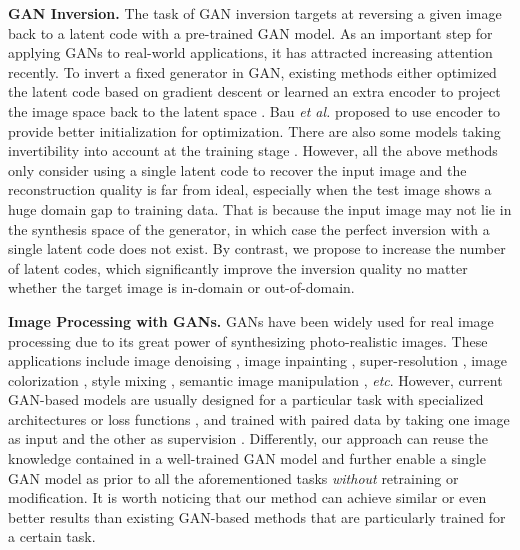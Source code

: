 \documentclass[10pt,twocolumn,letterpaper]{article}
\begin{document}
\vspace{2pt}\noindent\textbf{GAN Inversion.}
The task of GAN inversion targets at reversing a given image back to a latent code with a pre-trained GAN model.
As an important step for applying GANs to real-world applications, it has attracted increasing attention recently.
To invert a fixed generator in GAN, existing methods either optimized the latent code based on gradient descent \cite{lipton2017precise,inverting2018,invertibility} or learned an extra encoder to project the image space back to the latent space \cite{inverting2016,zhu2016generative,bau2019seeing,inverting2019}.
Bau \emph{et al.} \cite{bau2019semantic} proposed to use encoder to provide better initialization for optimization.
There are also some models taking invertibility into account at the training stage \cite{dumoulin2016adversarially,donahue2016adversarial,glow}.
However, all the above methods only consider using a single latent code to recover the input image and the reconstruction quality is far from ideal, especially when the test image shows a huge domain gap to training data.
That is because the input image may not lie in the synthesis space of the generator, in which case the perfect inversion with a single latent code does not exist.
By contrast, we propose to increase the number of latent codes, which significantly improve the inversion quality no matter whether the target image is in-domain or out-of-domain.


\vspace{2pt}\noindent\textbf{Image Processing with GANs.}
GANs have been widely used for real image processing due to its great power of synthesizing photo-realistic images.
These applications include image denoising \cite{chen2018image,kim2019grdn}, image inpainting \cite{yeh2017semantic,yu2018generative}, super-resolution \cite{ledig2017photo,wang2018esrgan}, image colorization \cite{suarez2017infrared,isola2017image}, style mixing \cite{hao2018mixgan,chen2018gated}, semantic image manipulation \cite{wang2018high,liang2018generative}, \emph{etc}.
However, current GAN-based models are usually designed for a particular task with specialized architectures \cite{hao2018mixgan,wang2018high} or loss functions \cite{ledig2017photo,chen2018gated}, and trained with paired data by taking one image as input and the other as supervision \cite{yeh2017semantic,isola2017image}.
Differently, our approach can reuse the knowledge contained in a well-trained GAN model and further enable a single GAN model as prior to all the aforementioned tasks \emph{without} retraining or modification.
It is worth noticing that our method can achieve similar or even better results than existing GAN-based methods that are particularly trained for a certain task.
\end{document}
